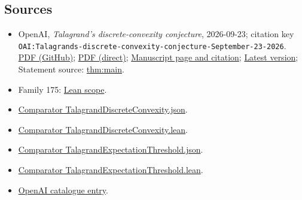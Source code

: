 \documentclass[11pt]{article}
\begin{document}
\subsection{Sources}
\begin{itemize}
\item OpenAI, \emph{Talagrand's discrete-convexity conjecture}, 2026-09-23; citation key \texttt{OAI:Talagrands-discrete-convexity-conjecture-September-23-2026}. \href{https://github.com/openai/math/blob/adc7f1241b42e322a6451854ab7e4b4c146bf78a/preprints/Talagrands-discrete-convexity-conjecture-September-23-2026/paper.pdf}{PDF (GitHub)}; \href{https://github.com/openai/math/raw/adc7f1241b42e322a6451854ab7e4b4c146bf78a/preprints/Talagrands-discrete-convexity-conjecture-September-23-2026/paper.pdf}{PDF (direct)}; \href{https://github.com/openai/math/blob/adc7f1241b42e322a6451854ab7e4b4c146bf78a/preprints/Talagrands-discrete-convexity-conjecture-September-23-2026/README.md}{Manuscript page and citation}; \href{https://github.com/openai/math/blob/main/preprints/Talagrands-discrete-convexity-conjecture-September-23-2026/paper.pdf}{Latest version}; Statement source: \href{https://github.com/openai/math/blob/adc7f1241b42e322a6451854ab7e4b4c146bf78a/preprints/Talagrands-discrete-convexity-conjecture-September-23-2026/build/source/sections/00\_intro.tex\#L43}{thm:main}.
\item Family 175: \href{https://github.com/openai/math/blob/adc7f1241b42e322a6451854ab7e4b4c146bf78a/lean/docs/175.md}{Lean scope}.
\item \href{https://github.com/openai/math/blob/adc7f1241b42e322a6451854ab7e4b4c146bf78a/lean/ComparatorChallenges/TalagrandDiscreteConvexity.json}{Comparator TalagrandDiscreteConvexity.json}.
\item \href{https://github.com/openai/math/blob/adc7f1241b42e322a6451854ab7e4b4c146bf78a/lean/ComparatorChallenges/TalagrandDiscreteConvexity.lean}{Comparator TalagrandDiscreteConvexity.lean}.
\item \href{https://github.com/openai/math/blob/adc7f1241b42e322a6451854ab7e4b4c146bf78a/lean/ComparatorChallenges/TalagrandExpectationThreshold.json}{Comparator TalagrandExpectationThreshold.json}.
\item \href{https://github.com/openai/math/blob/adc7f1241b42e322a6451854ab7e4b4c146bf78a/lean/ComparatorChallenges/TalagrandExpectationThreshold.lean}{Comparator TalagrandExpectationThreshold.lean}.
\item \href{https://github.com/openai/math/blob/adc7f1241b42e322a6451854ab7e4b4c146bf78a/CONTENTS.md}{OpenAI catalogue entry}.
\end{itemize}
\end{document}
